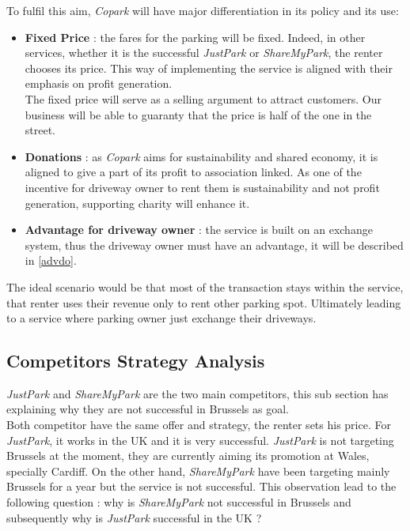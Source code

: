 \documentclass[12pt,a4paper,oneside]{book}
\newcommand{\bp}{\textit{Copark }}
\begin{document}
To fulfil this aim, \bp will have major differentiation in its policy and its use:
\begin{itemize}
\item \textbf{Fixed Price} : the fares for the parking will be fixed. Indeed, in other services, whether it is  the successful \textit{JustPark} or \textit{ShareMyPark}, the renter chooses its price. This way of implementing the service is aligned with their emphasis on profit generation.\\
The fixed price will serve as a selling argument to attract customers. Our business will be able to guaranty that the price is half of the one in the street.
\item \textbf{Donations} : as \bp aims for sustainability and shared economy, it is aligned to give a part of its profit to association linked. As one of the incentive for driveway owner to rent them is sustainability and not profit generation, supporting charity will enhance it.
\item \textbf{Advantage for driveway owner} : the service is built on an exchange system, thus the driveway owner must have an advantage, it will be described in \autoref{advdo}.
\end{itemize}

The ideal scenario would be that most of the transaction stays within the service, that renter uses their revenue only to rent other parking spot. Ultimately leading to a service where parking owner just exchange their driveways.

\subsection{Competitors Strategy Analysis}
\label{compsa}

\textit{JustPark} and \textit{ShareMyPark} are the two main competitors, this sub section has explaining why they are not successful in Brussels as goal.\\

Both competitor have the same offer and strategy, the renter sets his price. For \textit{JustPark}, it works in the UK and it is very successful. \textit{JustPark} is not targeting Brussels at the moment, they are currently aiming its promotion at Wales, specially Cardiff. On the other hand, \textit{ShareMyPark} have been targeting mainly Brussels for a year but the service is not successful. This observation lead to the following question : why is \textit{ShareMyPark} not successful in Brussels and subsequently why is \textit{JustPark} successful in the UK ?\\
\end{document}
